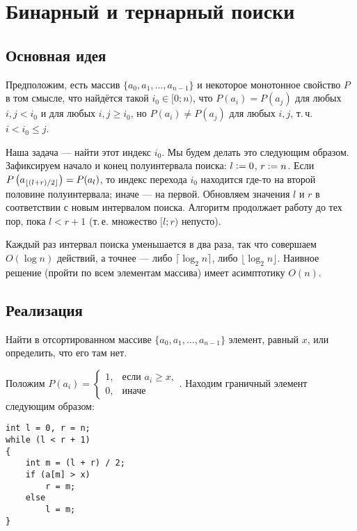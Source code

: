 \section{Бинарный и тернарный поиски}

\subsection{Основная идея}

Предположим, есть массив $\{a_0, a_1, \ldots, a_{n - 1}\}$ и некоторое монотонное свойство $P$ в том смысле, что найдётся такой $i_0 \in [0; n)$, что $P(a_i) = P(a_j)$ для любых $i, j < i_0$ и для любых $i, j \geqslant i_0$, но $P(a_i) \ne P(a_j)$ для любых $i, j$, т.\,ч. $i < i_0 \leqslant j$.

Наша задача --- найти этот индекс $i_0$. Мы будем делать это следующим образом. Зафиксируем начало и конец полуинтервала поиска: $l \vcentcolon = 0$, $r \vcentcolon = n$. Если $P\left(a_{\lfloor(l + r) / 2\rfloor}\right) = P(a_l)$, то индекс перехода $i_0$ находится где-то на второй половине полуинтервала; иначе --- на первой. Обновляем значения $l$ и $r$ в соответствии с новым интервалом поиска. Алгоритм продолжает работу до тех пор, пока $l < r + 1$ (т.\,е. множество $[l; r)$ непусто).

Каждый раз интервал поиска уменьшается в два раза, так что совершаем $O(\log n)$ действий, а точнее --- либо $\lceil\log_2n\rceil$, либо $\lfloor\log_2n\rfloor$. Наивное решение (пройти по всем элементам массива) имеет асимптотику $O(n)$.

\subsection{Реализация}

\begin{problem}
    Найти в отсортированном массиве $\{a_0, a_1, \ldots, a_{n - 1}\}$ элемент, равный $x$, или определить, что его там нет.
\end{problem}

Положим $
P(a_i) =
\begin{cases}
    1,&\text{если $a_i \geqslant x$},\\
    0,&\text{иначе}
\end{cases}
$. Находим граничный элемент следующим образом:

\begin{verbatim}
int l = 0, r = n;
while (l < r + 1)
{
    int m = (l + r) / 2;
    if (a[m] > x)
        r = m;
    else
        l = m;
}
\end{verbatim}

